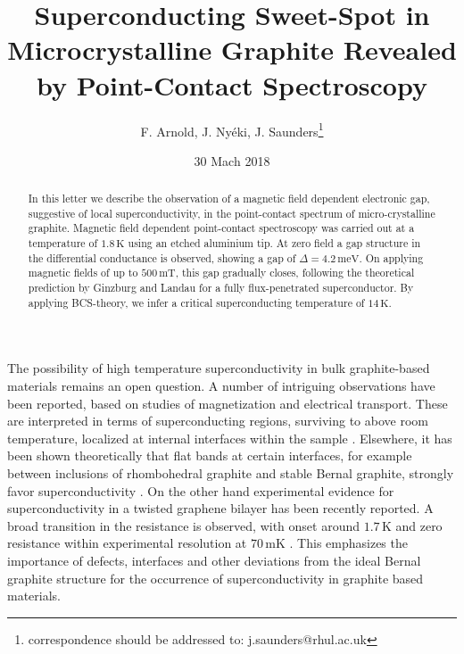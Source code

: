 \documentclass[aps,prb,reprint,twocolumn,showpacs]{revtex4-1}
\begin{document}
\title{Superconducting Sweet-Spot in Microcrystalline Graphite Revealed by Point-Contact Spectroscopy }

\author{F. Arnold, J. Ny\'eki, J. Saunders\/\thanks{correspondence should be addressed to: j.saunders@rhul.ac.uk}}


\date{30 Mach 2018}


\begin{abstract}In this letter we describe the observation of a magnetic field dependent electronic gap, suggestive of local superconductivity, in the point-contact spectrum of micro-crystalline graphite. Magnetic field dependent point-contact spectroscopy was carried out at a temperature of $1.8\,\mathrm{K}$ using an etched aluminium tip. At zero field a gap structure in the differential conductance is observed, showing a gap of $\Delta = 4.2\,\mathrm{meV}$. On applying magnetic fields of up to $500\,\mathrm{mT}$, this gap gradually closes, following the theoretical prediction by Ginzburg and Landau for a fully flux-penetrated superconductor. By applying BCS-theory, we infer a critical superconducting temperature of $14\,\mathrm{K}$. 
\end{abstract}




\maketitle

The possibility of high temperature superconductivity in bulk graphite-based materials remains an open question. A number of intriguing observations have been reported, based on studies of magnetization and electrical transport. These are interpreted in terms of superconducting regions, surviving to above room temperature, localized at internal interfaces within the sample \cite{Esquinazi18}. Elsewhere, it has been shown theoretically that flat bands at certain interfaces, for example between inclusions of rhombohedral graphite and stable Bernal graphite, strongly favor superconductivity \cite{Volovik18,Kopnin11}. On the other hand experimental evidence for superconductivity in a twisted graphene bilayer has been recently reported. A broad transition in the resistance is observed, with onset around $1.7\,\mathrm{K}$ and zero resistance within experimental resolution at $70\,\mathrm{mK}$ \cite{Cao18_26160}. This emphasizes the importance of defects, interfaces and other deviations from the ideal Bernal graphite structure for the occurrence of superconductivity in graphite based materials.
\end{document}
